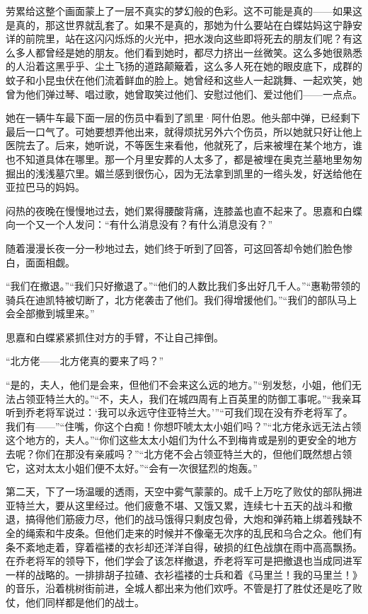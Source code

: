 \par 劳累给这整个画面蒙上了一层不真实的梦幻般的色彩。这不可能是真的——如果这是真的，那这世界就乱套了。如果不是真的，那她为什么要站在白蝶姑妈这宁静安详的前院里，站在这闪闪烁烁的火光中，把水泼向这些即将死去的朋友们呢？有这么多人都曾经是她的朋友。他们看到她时，都尽力挤出一丝微笑。这么多她很熟悉的人沿着这黑乎乎、尘土飞扬的道路颠簸着，这么多人死在她的眼皮底下，成群的蚊子和小昆虫伏在他们流着鲜血的脸上。她曾经和这些人一起跳舞、一起欢笑，她曾为他们弹过琴、唱过歌，她曾取笑过他们、安慰过他们、爱过他们——一点点。
\par 她在一辆牛车最下面一层的伤员中看到了凯里·阿什伯恩。他头部中弹，已经剩下最后一口气了。可她要想弄他出来，就得烦扰另外六个伤员，所以她就只好让他上医院去了。后来，她听说，不等医生来看他，他就死了，后来被埋在某个地方，谁也不知道具体在哪里。那一个月里安葬的人太多了，都是被埋在奥克兰墓地里匆匆掘出的浅浅墓穴里。媚兰感到很伤心，因为无法拿到凯里的一绺头发，好送给他在亚拉巴马的妈妈。
\par 闷热的夜晚在慢慢地过去，她们累得腰酸背痛，连膝盖也直不起来了。思嘉和白蝶向一个又一个人发问：“有什么消息没有？有什么消息没有？”
\par 随着漫漫长夜一分一秒地过去，她们终于听到了回答，可这回答却令她们脸色惨白，面面相觑。
\par “我们在撤退。”“我们只好撤退了。”“他们的人数比我们多出好几千人。”“惠勒带领的骑兵在迪凯特被切断了，北方佬袭击了他们。我们得增援他们。”“我们的部队马上会全部撤到城里来。”
\par 思嘉和白蝶紧紧抓住对方的手臂，不让自己摔倒。
\par “北方佬——北方佬真的要来了吗？”
\par “是的，夫人，他们是会来，但他们不会来这么远的地方。”“别发愁，小姐，他们无法占领亚特兰大的。”“不，夫人，我们在城四周有上百英里的防御工事呢。”“我亲耳听到乔老将军说过：‘我可以永远守住亚特兰大。'”“可我们现在没有乔老将军了。我们有——”“住嘴，你这个白痴！你想吓唬太太小姐们吗？”“北方佬永远无法占领这个地方的，夫人。”“你们这些太太小姐们为什么不到梅肯或是别的更安全的地方去呢？你们在那没有亲戚吗？”“北方佬不会占领亚特兰大的，但他们既然想占领它，这对太太小姐们便不太好。”“会有一次很猛烈的炮轰。”
\par 第二天，下了一场温暖的透雨，天空中雾气蒙蒙的。成千上万吃了败仗的部队拥进亚特兰大，要从这里经过。他们疲惫不堪、又饿又累，连续七十五天的战斗和撤退，搞得他们筋疲力尽，他们的战马饿得只剩皮包骨，大炮和弹药箱上绑着残缺不全的绳索和牛皮条。但他们走来的时候并不像毫无次序的乱民和乌合之众。他们有条不紊地走着，穿着褴褛的衣衫却还洋洋自得，破损的红色战旗在雨中高高飘扬。在乔老将军的领导下，他们学会了该怎样撤退，乔老将军可是把撤退也当成同进军一样的战略的。一排排胡子拉碴、衣衫褴褛的士兵和着《马里兰！我的马里兰！》的音乐，沿着桃树街前进，全城人都出来为他们欢呼。不管是打了胜仗还是吃了败仗，他们同样都是他们的战士。
